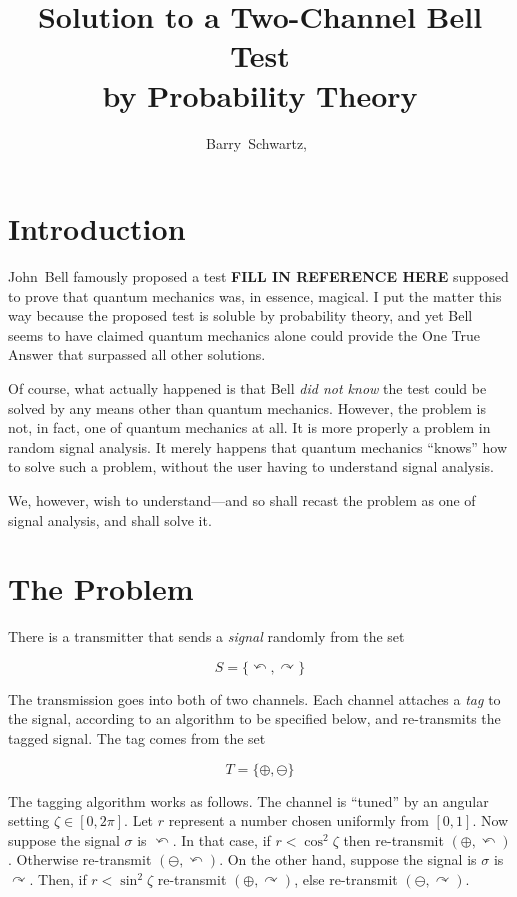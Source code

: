 \documentclass[9pt,technote]{IEEEtran}
\begin{document}
\title{Solution to a Two-Channel Bell Test\\by Probability Theory}
\author{Barry~Schwartz,~}

\maketitle

\section{Introduction}

John~Bell famously proposed a test {\bf{FILL IN REFERENCE HERE}}
supposed to prove that quantum mechanics was, in essence, magical. I
put the matter this way because the proposed test is soluble by
probability theory, and yet Bell seems to have claimed quantum
mechanics alone could provide the One True Answer that surpassed all
other solutions.

Of course, what actually happened is that Bell {\em{did not know}} the
test could be solved by any means other than quantum
mechanics. However, the problem is not, in fact, one of quantum
mechanics at all. It is more properly a problem in random signal
analysis. It merely happens that quantum mechanics ``knows'' how to
solve such a problem, without the user having to understand signal
analysis.

We, however, wish to understand---and so shall recast the problem as
one of signal analysis, and shall solve it.

\section{The Problem}

There is a transmitter that sends a {\em{signal}} randomly from the
set

\begin{equation}
  S=\{\curvearrowleft,\curvearrowright\}
\end{equation}

The transmission goes into both of two channels. Each channel attaches
a {\em{tag}} to the signal, according to an algorithm to be specified
below, and re-transmits the tagged signal. The tag comes from the set

\begin{equation}
  T=\{\oplus,\ominus\}
\end{equation}

The tagging algorithm works as follows. The channel is ``tuned'' by an
angular setting $\zeta\in[0,2\pi]$. Let $r$ represent a number chosen
uniformly from $[0,1]$. Now suppose the signal $\sigma$ is
$\curvearrowleft$. In that case, if $r < \cos^2 \zeta$ then
re-transmit $(\oplus,\curvearrowleft)$. Otherwise re-transmit
$(\ominus,\curvearrowleft)$. On the other hand, suppose the signal
is $\sigma$ is $\curvearrowright$. Then, if $r < \sin^2 \zeta$
re-transmit $(\oplus,\curvearrowright)$, else re-transmit
$(\ominus,\curvearrowright)$.
\end{document}
